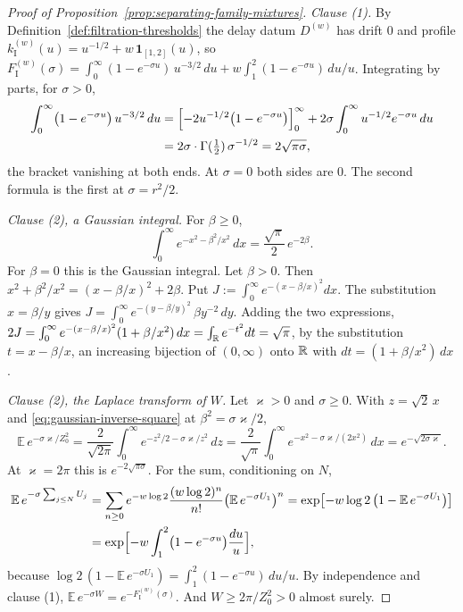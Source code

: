 \begin{proof}[Proof of Proposition~\ref{prop:separating-family-mixtures}]
\emph{Clause (1).} By Definition~\ref{def:filtration-thresholds} the delay datum $D^{(w)}$ has drift $0$
and profile $k^{(w)}_{\mathrm I}(u) = u^{-1/2} + w\,\mathbf 1_{[1,2]}(u)$, so
$F^{(w)}_{\mathrm I}(\sigma) = \int_0^\infty(1 - e^{-\sigma u})\,u^{-3/2}\,du +
w\int_1^2(1 - e^{-\sigma u})\,du/u$. Integrating by parts, for $\sigma > 0$,
\[
\begin{aligned}
  \int_0^\infty\bigl(1 - e^{-\sigma u}\bigr)\,u^{-3/2}\,du
   &= \Bigl[-2u^{-1/2}\bigl(1 - e^{-\sigma u}\bigr)\Bigr]_0^\infty
     + 2\sigma\int_0^\infty u^{-1/2}e^{-\sigma u}\,du \\
   &= 2\sigma\cdot\Gamma(\tfrac12)\,\sigma^{-1/2} = 2\sqrt{\pi\sigma} ,
\end{aligned}
\]
the bracket vanishing at both ends. At $\sigma = 0$ both sides are $0$. The second formula is the
first at $\sigma = r^2/2$.

\emph{Clause (2), a Gaussian integral.} For $\beta \ge 0$,
\begin{equation}\label{eq:gaussian-inverse-square}
  \int_0^\infty e^{-x^2 - \beta^2/x^2}\,dx = \frac{\sqrt\pi}{2}\,e^{-2\beta} .
\end{equation}
For $\beta = 0$ this is the Gaussian integral. Let $\beta > 0$. Then
$x^2 + \beta^2/x^2 = (x - \beta/x)^2 + 2\beta$. Put
$J := \int_0^\infty e^{-(x - \beta/x)^2}dx$. The substitution $x = \beta/y$ gives
$J = \int_0^\infty e^{-(y - \beta/y)^2}\,\beta y^{-2}\,dy$. Adding the two expressions,
$2J = \int_0^\infty e^{-(x - \beta/x)^2}(1 + \beta/x^2)\,dx = \int_{\mathbb{R}}e^{-t^2}dt = \sqrt\pi$,
by the substitution $t = x - \beta/x$, an increasing bijection of $(0,\infty)$ onto $\mathbb{R}$ with
$dt = (1 + \beta/x^2)\,dx$.

\emph{Clause (2), the Laplace transform of $W$.} Let $\varkappa > 0$ and $\sigma \ge 0$. With
$z = \sqrt2\,x$ and \ref{eq:gaussian-inverse-square} at $\beta^2 = \sigma\varkappa/2$,
\[
  \mathbb{E}\,e^{-\sigma\varkappa/Z_0^2}
   = \frac{2}{\sqrt{2\pi}}\int_0^\infty e^{-z^2/2 - \sigma\varkappa/z^2}\,dz
   = \frac{2}{\sqrt\pi}\int_0^\infty e^{-x^2 - \sigma\varkappa/(2x^2)}\,dx
   = e^{-\sqrt{2\sigma\varkappa}} .
\]
At $\varkappa = 2\pi$ this is $e^{-2\sqrt{\pi\sigma}}$. For the sum, conditioning on $N$,
\[
\begin{aligned}
  \mathbb{E}\,e^{-\sigma\sum_{j \le N}U_j}
   &= \sum_{n \ge 0}e^{-w\log 2}\frac{(w\log 2)^n}{n!}\bigl(\mathbb{E}\,e^{-\sigma U_1}\bigr)^n
   = \exp\bigl[-w\log 2\,\bigl(1 - \mathbb{E}\,e^{-\sigma U_1}\bigr)\bigr] \\
   &= \exp\Bigl[-w\int_1^2\bigl(1 - e^{-\sigma u}\bigr)\frac{du}{u}\Bigr] ,
\end{aligned}
\]
because $\log 2\,(1 - \mathbb{E}\,e^{-\sigma U_1}) = \int_1^2(1 - e^{-\sigma u})\,du/u$. By
independence and clause (1), $\mathbb{E}\,e^{-\sigma W} = e^{-F^{(w)}_{\mathrm I}(\sigma)}$. And
$W \ge 2\pi/Z_0^2 > 0$ almost surely.


\end{proof}
